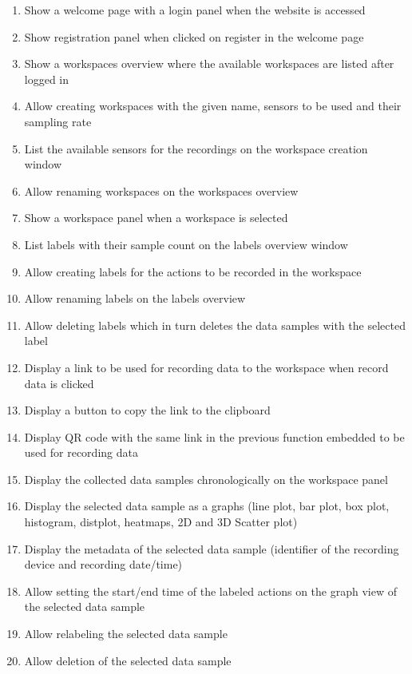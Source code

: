 \begin{enumerate}[{label = \textbf{/F{\protect\twodigits{\arabic{enumi}}}0/}, leftmargin = *}]
    \item \label{/F010/} Show a welcome page with a login panel when the website is accessed
    \item Show registration panel when clicked on register in the welcome page
    \item Show a workspaces overview where the available workspaces are listed after logged in
    \item Allow creating workspaces with the given name, sensors to be used and their sampling rate
    \item List the available sensors for the recordings on the workspace creation window
    \item Allow renaming workspaces on the workspaces overview
    \item Show a workspace panel when a workspace is selected
    \item List labels with their sample count on the labels overview window
    \item Allow creating labels for the actions to be recorded in the workspace
    \item Allow renaming labels on the labels overview
    \item Allow deleting labels which in turn deletes the data samples with the selected label
    \item Display a link to be used for recording data to the workspace when record data is clicked
    \item Display a button to copy the link to the clipboard
    \item Display QR code with the same link in the previous function embedded to be used for recording data
    \item Display the collected data samples chronologically on the workspace panel
    \item Display the selected data sample as a graphs (line plot, bar plot, box plot, histogram, distplot, heatmaps, 2D and 3D Scatter plot)
    \item Display the metadata of the selected data sample (identifier of the recording device and recording date/time)
    \item Allow setting the start/end time of the labeled actions on the graph view of the selected data sample
    \item Allow relabeling the selected data sample
    \item Allow deletion of the selected data sample

\end{enumerate}
